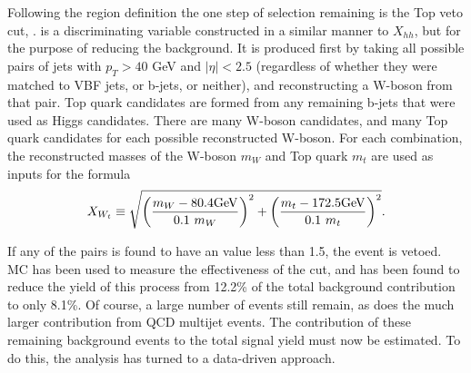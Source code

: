         \FloatBarrier
        Following the region definition the one step of selection remaining is the Top veto cut, \xwt.
        \xwt is a discriminating variable constructed in a similar manner to $X_{hh}$,
            but for the purpose of reducing the \ttbar background.
        It is produced first by taking all possible pairs of jets with $p_T > 40$ GeV and $|\eta| < 2.5$
            (regardless of whether they were matched to VBF jets, or b-jets, or neither),
            and reconstructing a W-boson from that pair.
        Top quark candidates are formed from any remaining b-jets that were used as Higgs candidates.
        There are many W-boson candidates, and many Top quark candidates for each possible reconstructed W-boson.
        For each combination, the reconstructed masses of the W-boson $m_W$ and Top quark $m_t$
            are used as inputs for the formula
        \begin{equation}
            \xwt \equiv \sqrt{\left(\frac{m_W - 80.4\textrm{GeV}}{0.1 \ m_W}\right)^{2}
                + \left(\frac{m_t - 172.5\textrm{GeV}}{0.1 \ m_t}\right)^{2}}.
            \label{eq:xwt}
        \end{equation}

        If any of the pairs is found to have an \xwt value less than 1.5, the event is vetoed. 
        \ttbar MC has been used to measure the effectiveness of the \xwt cut,
            and has been found to reduce the yield of this process from
            12.2\% of the total background contribution to only 8.1\%.
        Of course, a large number of \ttbar events still remain,
            as does the much larger contribution from QCD multijet events.
        The contribution of these remaining background events to the total signal yield
            must now be estimated.
        To do this, the analysis has turned to a data-driven approach.

